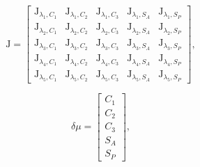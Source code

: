\documentclass[twoside]{bhamthesis}
\theoremstyle{definition}
\begin{document}
\begin{figure}[!ht]
	\begin{minipage}{.7\textwidth}
   \begin{equation}
	\mathrm{J} = \left[ \begin{matrix} \mathrm{J}_{\lambda_{1},C_{1}} & \mathrm{J}_{\lambda_{1},C_{2}} & \mathrm{J}_{\lambda_{1},C_{3}} &   \mathrm{J}_{\lambda_{1},S_A} &   \mathrm{J}_{\lambda_{1},S_P}
\\ \mathrm{J}_{\lambda_{2},C_{1}} & \mathrm{J}_{\lambda_{2},C_{2}} & \mathrm{J}_{\lambda_{2},C_{3}} &   \mathrm{J}_{\lambda_{2},S_A} & \mathrm{J}_{\lambda_{2},S_P}
\\ \mathrm{J}_{\lambda_{3},C_{1}} & \mathrm{J}_{\lambda_{3},C_{2}} & \mathrm{J}_{\lambda_{3},C_{3}} &   \mathrm{J}_{\lambda_{3},S_A} & \mathrm{J}_{\lambda_{3},S_P}
\\ \mathrm{J}_{\lambda_{4},C_{1}} & \mathrm{J}_{\lambda_{4},C_{2}} & \mathrm{J}_{\lambda_{4},C_{3}} &   \mathrm{J}_{\lambda_{4},S_A} & \mathrm{J}_{\lambda_{4},S_P}
\\ \mathrm{J}_{\lambda_{5},C_{1}} & \mathrm{J}_{\lambda_{5},C_{2}} & \mathrm{J}_{\lambda_{5},C_{3}} &   \mathrm{J}_{\lambda_{5},S_A} & \mathrm{J}_{\lambda_{5},S_P}
\end{matrix} \right], 
  	\label{eqn:Spec_cons_jacob}
    \end{equation} 
  \end{minipage}%
  \begin{minipage}{.3\textwidth}
    \begin{equation}
\delta \mu = \left[ \begin{matrix} C_{1} 
\\ C_{2}
\\C_{3}
\\S_A
\\S_P
\end{matrix} \right],
  	\label{eqn:Spec_cons_jacob2}
    \end{equation}
  \end{minipage}
\end{figure}
\end{document}

